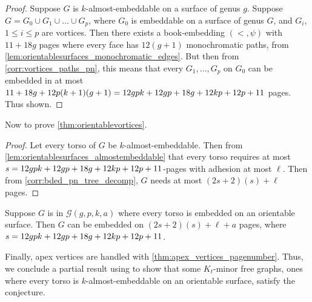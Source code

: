 \begin{proof}
	Suppose $G$ is $k$-almost-embeddable on a surface of genus $g$. Suppose $G = G_0 \cup G_1 \cup \ldots \cup G_p$, where $G_0$ is embeddable on a surface of genus $G$, and $G_i$, $1 \leq i \leq p$ are vortices. Then there exists a book-embedding $(<, \psi)$ with $11 + 18g$ pages where every face has $12(g+1)$ monochromatic paths, from \cref{lem:orientablesurfaces_monochromatic_edges}. But then from \cref{corr:vortices_paths_pn}, this means that every $G_1, \ldots, G_p$ on $G_0$ can be embedded in at most $11 + 18g + 12p(k + 1)(g + 1) = 12gpk + 12gp + 18g + 12kp + 12p + 11 $ pages. Thus shown.
\end{proof}

Now to prove \cref{thm:orientablevortices}. 
\begin{proof}
	Let every torso of $G$ be $k$-almost-embeddable. Then from \cref{lem:orientablesurfaces_almostembeddable} that every torso requires at most $s = 12gpk + 12gp + 18g + 12kp + 12p + 11 $-pages with adhesion at most $\ell$. Then from \cref{corr:bded_pn_tree_decomp}, $G$ needs at most $(2s + 2)(s) + \ell$ pages.
\end{proof}


\begin{corollary}
	Suppose $G$ is in $\mathcal{G}(g, p, k, a)$ where every torso is embedded on an orientable surface. Then $G$ can be embedded on $(2s + 2)(s) + \ell + a$ pages, where $s = 12gpk + 12gp + 18g + 12kp + 12p + 11$. 
\end{corollary}
Finally, apex vertices are handled with \cref{thm:apex_vertices_pagenumber}. Thus, we conclude a partial result using \textcite{robertsonGraphMinorsXVI2003} to show that some $K_t$-minor free graphs, ones where every torso is $k$-almost-embeddable on an orientable surface, satisfy the conjecture.